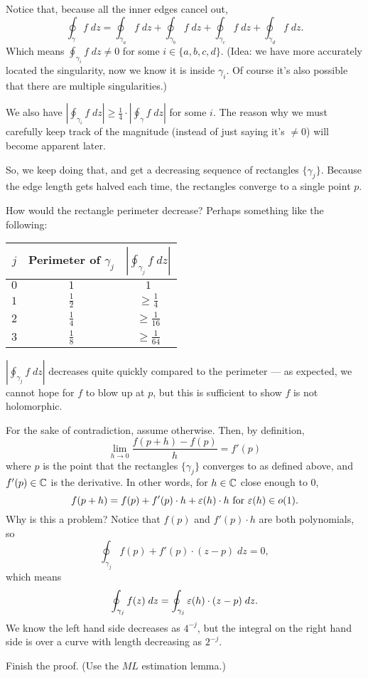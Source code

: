 Notice that, because all the inner edges cancel out,
\[
	\oint_\gamma f \; dz =
	\oint_{\gamma_a} f \; dz + \oint_{\gamma_b} f \; dz +
	\oint_{\gamma_c} f \; dz + \oint_{\gamma_d} f \; dz.
\]
Which means $\oint_{\gamma_i} f \; dz \neq 0$ for some $i \in \{ a, b, c, d \}$.
(Idea: we have more accurately located the singularity, now we know it is inside $\gamma_i$.
Of course it's also possible that there are multiple singularities.)

We also have $|\oint_{\gamma_i} f \; dz| \geq \frac{1}{4} \cdot |\oint_\gamma f \; dz|$
for some $i$.
The reason why we must carefully keep track of the magnitude (instead of just saying it's $\neq 0$)
will become apparent later.

So, we keep doing that, and get a decreasing sequence of rectangles $\{ \gamma_j \}$. Because the
edge length gets halved each time, the rectangles converge to a single point $p$.

How would the rectangle perimeter decrease? Perhaps something like the following:
\begin{center}
	\begin{tabular}{ccc}
		$j$ & Perimeter of $\gamma_j$ & $|\oint_{\gamma_j} f \; dz|$ \\ \hline
		$0$ & $1$ & $1$ \\
		$1$ & $\frac{1}{2}$ & $\geq \frac{1}{4}$ \\
		$2$ & $\frac{1}{4}$ & $\geq \frac{1}{16}$ \\
		$3$ & $\frac{1}{8}$ & $\geq \frac{1}{64}$
	\end{tabular}
\end{center}
$|\oint_{\gamma_j} f \; dz|$ decreases quite quickly compared to the perimeter --- as expected, we
cannot hope for $f$ to blow up at $p$, but this is sufficient to show $f$ is not holomorphic.

For the sake of contradiction, assume otherwise. Then, by definition,
\[ \lim_{h \to 0} \frac{f(p+h)-f(p)}{h} = f'(p) \]
where $p$ is the point that the rectangles $\{ \gamma_j \}$ converges to as defined above,
and $f'(p) \in \mathbb C$ is the derivative.  In other words, for $h \in \mathbb C$ close enough to $0$,
\[ f(p+h) = f(p) + f'(p) \cdot h + \varepsilon(h) \cdot h\text{ for }\varepsilon(h) \in o(1).  \]
Why is this a problem? Notice that $f(p)$ and $f'(p) \cdot h$ are both polynomials, so
\[ \oint_{\gamma_j} f(p) + f'(p) \cdot (z-p) \; dz = 0, \]
which means
\[ \oint_{\gamma_j} f(z)\; dz = \oint_{\gamma_j} \varepsilon(h) \cdot (z-p) \; dz. \]
We know the left hand side decreases as $4^{-j}$, but the integral on the right hand side is over a
curve with length decreasing as $2^{-j}$.
\begin{exercise}
	Finish the proof. (Use the $ML$ estimation lemma.)
\end{exercise}


